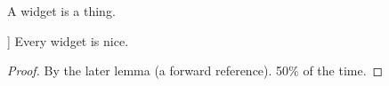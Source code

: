 \begin{definition}[Widget]\label{def-widget}\leanok
A widget is a thing. %
\end{definition}

\begin{lemma}[Widgets are nice [really]]\label{nice}
  \leanok
  Every widget is nice.
\end{lemma}
\begin{proof}
  \leanok
  By the later lemma (a forward reference). 50\% of the time.
\end{proof}
